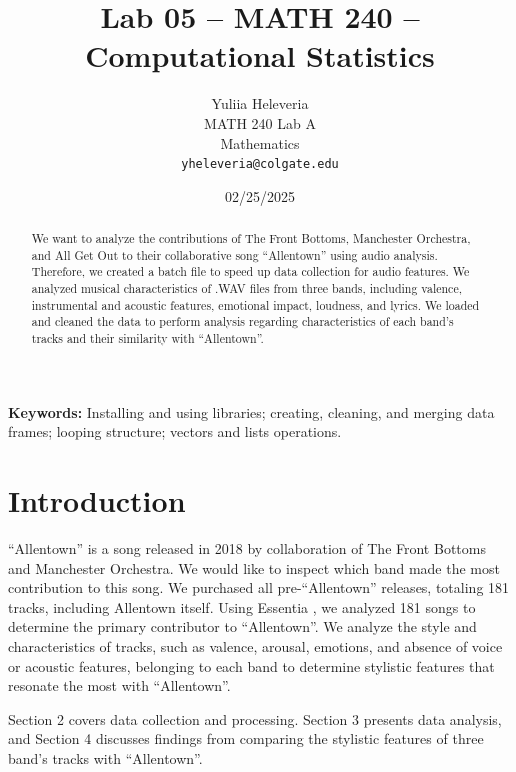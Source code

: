 \documentclass{article}\usepackage[]{graphicx}\usepackage[]{xcolor}
\begin{document}
\vspace{-1in}
\title{Lab 05 -- MATH 240 -- Computational Statistics}

\author{
  Yuliia Heleveria \\
  MATH 240 Lab A  \\
  Mathematics  \\
  {\tt yheleveria@colgate.edu}
}

\date{02/25/2025}

\maketitle

\begin{multicols}{2}
\begin{abstract}
We want to analyze the contributions of The Front Bottoms, Manchester Orchestra, and All Get Out to their collaborative song ``Allentown'' using audio analysis. Therefore, we created a batch file to speed up data collection for audio features. We analyzed musical characteristics of .WAV files from three bands, including valence, instrumental and acoustic features, emotional impact, loudness, and lyrics. We loaded and cleaned the data to perform analysis regarding characteristics of each band's tracks and their similarity with ``Allentown''. 
\end{abstract}

\noindent \textbf{Keywords:} Installing and using libraries; creating, cleaning, and merging data frames; looping structure; vectors and lists operations.

\section{Introduction}
``Allentown'' is a song released in 2018 by collaboration of The Front Bottoms and Manchester Orchestra. We would like to inspect which band made the most contribution to this song. We purchased all pre-``Allentown'' releases, totaling 181 tracks, including Allentown itself.
Using Essentia \citep{bogdanov2013essentia}, we analyzed 181 songs to determine the primary contributor to ``Allentown''. We analyze the style and characteristics of tracks, such as valence, arousal, emotions, and absence of voice or acoustic features, belonging to each band to determine stylistic features that resonate the most with ``Allentown''. 

Section 2 covers data collection and processing. Section 3 presents data analysis, and Section 4 discusses findings from comparing the stylistic features of three band's tracks with ``Allentown''.


\end{multicols}
\end{document}
